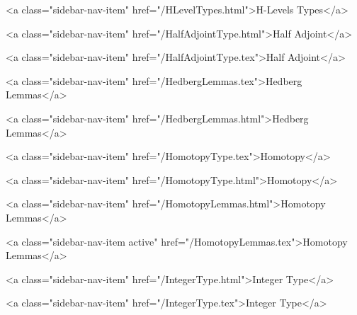       
        
          <a class="sidebar-nav-item" href="/HLevelTypes.html">H-Levels Types</a>
        
      
    
      
        
          <a class="sidebar-nav-item" href="/HalfAdjointType.html">Half Adjoint</a>
        
      
    
      
        
          <a class="sidebar-nav-item" href="/HalfAdjointType.tex">Half Adjoint</a>
        
      
    
      
        
          <a class="sidebar-nav-item" href="/HedbergLemmas.tex">Hedberg Lemmas</a>
        
      
    
      
        
          <a class="sidebar-nav-item" href="/HedbergLemmas.html">Hedberg Lemmas</a>
        
      
    
      
        
          <a class="sidebar-nav-item" href="/HomotopyType.tex">Homotopy</a>
        
      
    
      
        
          <a class="sidebar-nav-item" href="/HomotopyType.html">Homotopy</a>
        
      
    
      
        
          <a class="sidebar-nav-item" href="/HomotopyLemmas.html">Homotopy Lemmas</a>
        
      
    
      
        
          <a class="sidebar-nav-item active" href="/HomotopyLemmas.tex">Homotopy Lemmas</a>
        
      
    
      
        
          <a class="sidebar-nav-item" href="/IntegerType.html">Integer Type</a>
        
      
    
      
        
          <a class="sidebar-nav-item" href="/IntegerType.tex">Integer Type</a>
        
      
    
